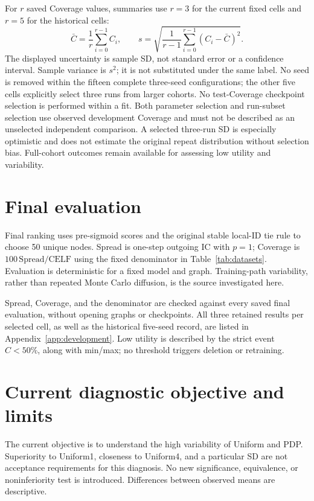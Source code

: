 For $r$ saved Coverage values, summaries use $r=3$ for the current fixed cells and $r=5$ for the historical cells:
\begin{equation}
 \bar C=\frac{1}{r}\sum_{i=0}^{r-1}C_i,\qquad
 s=\sqrt{\frac{1}{r-1}\sum_{i=0}^{r-1}(C_i-\bar C)^2}.\label{eq:fiveseed}
\end{equation}
The displayed uncertainty is sample SD, not standard error or a confidence interval. Sample variance is $s^2$; it is not substituted under the same label. No seed is removed within the fifteen complete three-seed configurations; the other five cells explicitly select three runs from larger cohorts. No test-Coverage checkpoint selection is performed within a fit. Both parameter selection and run-subset selection use observed development Coverage and must not be described as an unselected independent comparison. A selected three-run SD is especially optimistic and does not estimate the original repeat distribution without selection bias. Full-cohort outcomes remain available for assessing low utility and variability.

\section{Final evaluation}
Final ranking uses pre-sigmoid scores and the original stable local-ID tie rule to choose 50 unique nodes. Spread is one-step outgoing IC with $p=1$; Coverage is $100\,\mathrm{Spread}/\mathrm{CELF}$ using the fixed denominator in Table~\ref{tab:datasets}. Evaluation is deterministic for a fixed model and graph. Training-path variability, rather than repeated Monte Carlo diffusion, is the source investigated here.

Spread, Coverage, and the denominator are checked against every saved final evaluation, without opening graphs or checkpoints. All three retained results per selected cell, as well as the historical five-seed record, are listed in Appendix~\ref{app:development}. Low utility is described by the strict event $C<50\%$, along with min/max; no threshold triggers deletion or retraining.

\section{Current diagnostic objective and limits}
The current objective is to understand the high variability of Uniform and PDP. Superiority to Uniform1, closeness to Uniform4, and a particular SD are not acceptance requirements for this diagnosis. No new significance, equivalence, or noninferiority test is introduced. Differences between observed means are descriptive.

